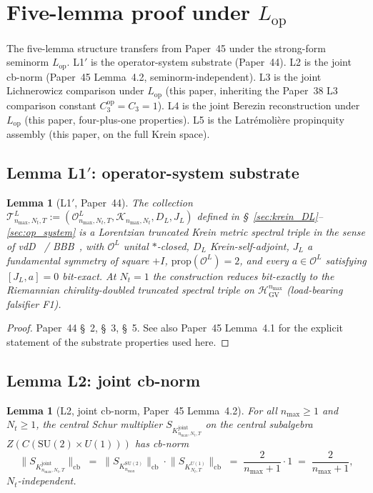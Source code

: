 \documentclass[11pt,a4paper]{article}
\theoremstyle{plain}
\newtheorem{lemma}[theorem]{Lemma}
\theoremstyle{definition}
\newcommand{\nmax}{n_{\max}}
\newcommand{\Nt}{N_{t}}
\newcommand{\Krein}{\mathcal{K}}
\newcommand{\Op}{\mathcal{O}}
\newcommand{\Tcal}{\mathcal{T}}
\newcommand{\cbnorm}[1]{\lVert #1 \rVert_{\mathrm{cb}}}
\newcommand{\SU}{\mathrm{SU}}
\newcommand{\Uone}{U(1)}
\newcommand{\DL}{D_{L}}
\newcommand{\JL}{J_{L}}
\newcommand{\Lop}{L_{\mathrm{op}}}
\newcommand{\Kjoint}{K^{\mathrm{joint}}}
\newcommand{\KSU}{K^{\SU(2)}}
\newcommand{\KU}{K^{\Uone}}
\newcommand{\Cthreeop}{C_{3}^{\mathrm{op}}}
\newcommand{\HGV}{\mathcal{H}_{\mathrm{GV}}}
\newcommand{\prop}{\mathrm{prop}}
\begin{document}
\section{Five-lemma proof under $\Lop$}\label{sec:five_lemmas}

The five-lemma structure transfers from Paper~45 under the strong-form
seminorm $\Lop$. L1$'$ is the operator-system substrate (Paper~44). L2
is the joint cb-norm (Paper~45 Lemma~4.2, seminorm-independent). L3 is
the joint Lichnerowicz comparison under $\Lop$ (this paper, inheriting the
Paper~38 L3 comparison constant $\Cthreeop = C_{3} = 1$). L4 is the joint Berezin
reconstruction under $\Lop$ (this paper, four-plus-one properties). L5
is the Latr\'emoli\`ere propinquity assembly (this paper, on the full
Krein space).

\subsection{Lemma L1$'$: operator-system substrate}\label{sec:L1prime}

\begin{lemma}[L1$'$, Paper~44]\label{lem:L1prime}
The collection
$\Tcal^{L}_{\nmax,\Nt,T} := (\Op^{L}_{\nmax,\Nt,T},
\Krein_{\nmax,\Nt}, \DL, \JL)$ defined in
\S~\ref{sec:krein_DL}--\ref{sec:op_system} is a Lorentzian truncated
Krein metric spectral triple in the sense of
vdD~\cite{vandungen2016} / BBB~\cite{bizi_brouder_besnard2018}, with
$\Op^{L}$ unital $\ast$-closed, $\DL$ Krein-self-adjoint, $\JL$ a
fundamental symmetry of square $+I$, $\prop(\Op^{L}) = 2$, and every
$a \in \Op^{L}$ satisfying $[\JL, a] = 0$ bit-exact. At $\Nt = 1$ the
construction reduces bit-exactly to the Riemannian chirality-doubled
truncated spectral triple on $\HGV^{\nmax}$ (load-bearing falsifier
F1).
\end{lemma}

\begin{proof}
Paper~44 \S~2, \S~3, \S~5. See also Paper~45 Lemma~4.1 for the explicit
statement of the substrate properties used here. \qedhere
\end{proof}

\subsection{Lemma L2: joint cb-norm}\label{sec:L2}

\begin{lemma}[L2, joint cb-norm, Paper~45 Lemma~4.2]\label{lem:L2}
For all $\nmax \ge 1$ and $\Nt \ge 1$, the central Schur multiplier
$S_{\Kjoint_{\nmax, \Nt, T}}$ on the central subalgebra
$Z(C(\SU(2) \times \Uone))$ has cb-norm
\begin{equation}\label{eq:L2_main}
   \cbnorm{S_{\Kjoint_{\nmax, \Nt, T}}}
   \;=\; \cbnorm{S_{\KSU_{\nmax}}} \cdot \cbnorm{S_{\KU_{\Nt, T}}}
   \;=\; \frac{2}{\nmax + 1} \cdot 1
   \;=\; \frac{2}{\nmax + 1},
\end{equation}
$\Nt$-independent.
\end{lemma}
\end{document}
